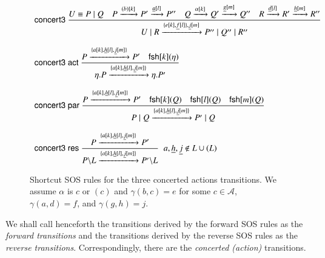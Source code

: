 {\begin{figure}[t] 
\[
\begin{array}{l}
\rulename{concert3}\ 
\Rule
{U\equiv P \paral Q \quad  P\xrightarrow{(b)[k]}P'\xrightarrow{\underline{a}[l]}P'' 
  \quad Q\xrightarrow{\alpha[k]}Q' \xrightarrow{\underline{g}[m]}Q''
  \quad R\xrightarrow{\underline{d}[l]} R'\xrightarrow{\underline{h}[m]}R'' %
 }
{U \paral R\xrightarrow{\{e[k],\underline{f}[l]\},\underline{j}[m]} P'' \paral Q''\paral R''}\\[25pt]
\rulename{concert3 act}\
\Rule
{P \xrightarrow{\{{a}[k], \underline{h}[l], \underline{j}[m]\}} P' \quad \fresh{k}{\eta}}
{\eta.P \xrightarrow{\{{a}[k], \underline{h}[l], \underline{j}[m]\}} \eta.P'}\\[25pt]
\rulename{concert3 par}\
\Rule
{P \xrightarrow{\{{a}[k], \underline{h}[l], \underline{j}[m]\}} P'\quad \fresh{k}{Q} \quad \fresh{l}{Q}\quad \fresh{m}{Q}}
{P \paral Q \xrightarrow{\{{a}[k], \underline{h}[l], \underline{j}[m]\}} P' \paral Q}\\[25pt]
\rulename{concert3 res}\
\Rule
{P \xrightarrow{\{{a}[k], \underline{h}[l], \underline{j}[m]\}} P'}
{P\backslash L \xrightarrow{\{{a}[k], \underline{h}[l], \underline{j}[m]\}} P'\backslash L}\;\;  a, \underline{h}, \underline{j}  \notin L \cup (L)
%
\end{array}
\] 
\caption{Shortcut SOS rules for the three concerted actions transitions.  We assume $\alpha$ is $c$ or $(c)$ 
and $\gamma(b,c)=e$ for some $c\in \mathcal{A}$, $\gamma(a,d)=f$, and  $\gamma(g,h)=j$.}
\label{fig:xc3sos} 
\end{figure}


We shall call henceforth the transitions derived by the forward SOS rules as the \emph{forward transitions} 
and the transitions derived by the reverse SOS rules as the \emph{reverse transitions}.
Correspondingly, there are the \emph{concerted (action)} transitions. 
%
%
%
}
